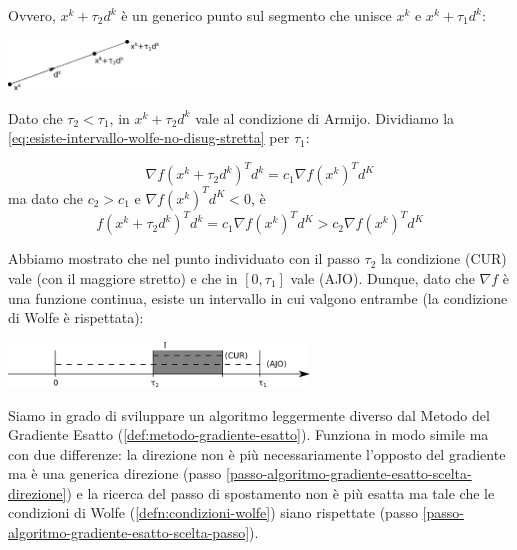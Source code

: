 \begin{proposition}
\begin{thproof}
Ovvero, $x^k + \tau_2 d^k$ \`e un generico punto sul segmento che unisce
$x^{k}$ e $x^{k} + \tau_{1} d^{k}$:

\centerline{\includegraphics[width=0.30\textwidth]{imgs/passo-intermedio.png}}

Dato che $\tau_2 < \tau_1$, in $x^k + \tau_2 d^k$ vale al condizione
di Armijo. Dividiamo la
\ref{eq:esiste-intervallo-wolfe-no-disug-stretta} per $\tau_1$:

$$\nabla f(x^{k} + \tau_2 d^{k})^{T} d^{k} = c_1 \nabla f(x^{k})^{T} d^{K}$$
ma dato che $c_2 > c_1$ e $\nabla f(x^{k})^{T} d^{K} < 0$, \`e
$$f(x^{k} + \tau_2 d^{k})^{T} d^{k} = c_1 \nabla f(x^{k})^{T} d^{K} > c_2 \nabla f(x^{k})^{T} d^{K}$$

Abbiamo mostrato che nel punto individuato con il passo $\tau_2$ la
condizione (CUR) vale (con il maggiore stretto) e che in $[0, \tau_1]$
vale (AJO). Dunque, dato che $\nabla f$ \`e una funzione continua,
esiste un intervallo in cui valgono entrambe (la condizione di Wolfe \`e
rispettata):

\centerline{\includegraphics[width=0.60\textwidth]{imgs/intervallo-wolfe.png}}

\end{thproof}
\end{proposition}

Siamo in grado di sviluppare un algoritmo leggermente diverso dal
Metodo del Gradiente Esatto
(\ref{def:metodo-gradiente-esatto}). Funziona in modo simile ma con
due differenze: la direzione non \`e pi\`u necessariamente l'opposto del
gradiente ma \`e una generica direzione (passo
\ref{passo-algoritmo-gradiente-esatto-scelta-direzione}) e la ricerca
del passo di spostamento non \`e pi\`u esatta ma tale che le condizioni di
Wolfe (\ref{defn:condizioni-wolfe}) siano rispettate (passo
\ref{passo-algoritmo-gradiente-esatto-scelta-passo}).


